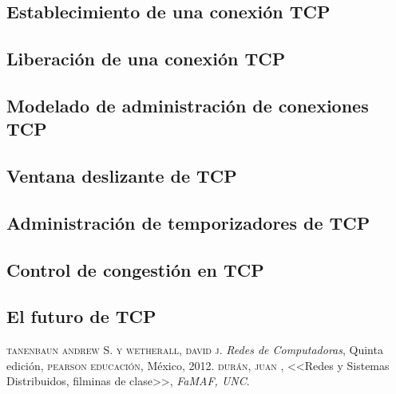 \documentclass[10pt,a4paper]{report}
\begin{document}
\subsection{Establecimiento de una conexión TCP}
\subsection{Liberación de una conexión TCP}
\subsection{Modelado de administración de conexiones TCP}
\subsection{Ventana deslizante de TCP}
\subsection{Administración de temporizadores de TCP}
\subsection{Control de congestión en TCP}
\subsection{El futuro de TCP}

\begin{thebibliography}{X}
 \textsc{tanenbaun andrew S. y wetherall, david j.}
\textit{Redes de Computadoras}, Quinta edición,
\textsc{pearson educación}, México, 2012.
 \textsc{durán, juan },
<<Redes y Sistemas Distribuidos, filminas de clase>>,
\textit{FaMAF, UNC}.
\end{thebibliography}
\end{document}

